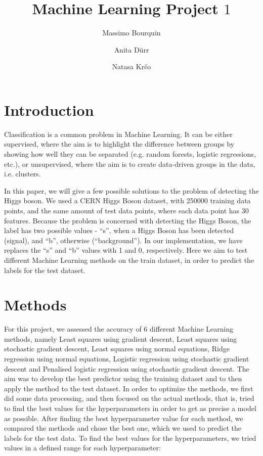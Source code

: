 \documentclass{article}
\begin{document}
	\title{Machine Learning Project $1$}
	
	\author{Massimo Bourquin \and Anita D\" urr \and Natasa Kr\v co}
	
	\maketitle
	
	\section{Introduction}
	
	Classification is a common problem in Machine Learning. It can be either supervised, where the aim is to highlight the difference between groups by showing how well they can be separated (e.g. random forests, logistic regressions, etc.), or unsupervised, where the aim is to create data-driven groups in the data, i.e. clusters.
	
	In this paper, we will give a few possible solutions to the problem of detecting the Higgs boson. We used a CERN Higgs Boson dataset, with 250000 training data points, and the same amount of test data points, where each data point has 30 features. Because the problem is concerned with detecting the Higgs Boson, the label has two possible values - “s”, when a Higgs Boson has been detected (signal), and “b”, otherwise (“background”). In our implementation, we have replaces the “s” and “b” values with 1 and 0, respectively.
	Here we aim to test different Machine Learning methods on the train dataset, in order to predict the labels for the test dataset.
	
	
	\section{Methods}
	For this project, we assessed the accuracy of 6 different Machine Learning methods, namely Least squares using gradient descent, Least squares using stochastic gradient descent, Least squares using normal equations, Ridge regression using normal equations, Logistic regression using stochastic gradient descent and Penalised logistic regression using stochastic gradient descent. The aim was to develop the best predictor using the training dataset and to then apply the method to the test dataset.
	In order to optimize the methods, we first did some data processing, and then focused on the actual methods, that is, tried to find the best values for the hyperparameters in order to get as precise a model as possible. After finding the best hyperparameter value for each method, we compared the methods and chose the best one, which we used to predict the labels for the test data. To find the best values for the hyperparameters, we tried values in a defined range for each hyperparameter:
	
\end{document}
